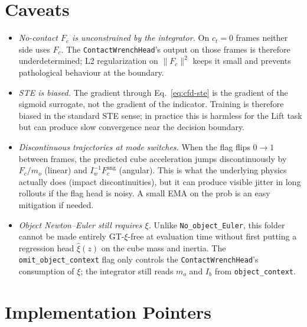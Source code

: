 \documentclass[11pt]{article}
\begin{document}
\section{Caveats}

\begin{itemize}
  \item \emph{No-contact $F_c$ is unconstrained by the integrator.}
    On $c_t = 0$ frames neither side uses $F_c$.  The
    \texttt{ContactWrenchHead}'s output on those frames is therefore
    underdetermined; L2 regularization on $\|F_c\|^2$ keeps it small
    and prevents pathological behaviour at the boundary.
  \item \emph{STE is biased.}  The gradient through
    Eq.~\eqref{eq:cfd-ste} is the gradient of the sigmoid surrogate,
    not the gradient of the indicator.  Training is therefore biased
    in the standard STE sense; in practice this is harmless for the
    Lift task but can produce slow convergence near the decision
    boundary.
  \item \emph{Discontinuous trajectories at mode switches.}  When the
    flag flips $0 \to 1$ between frames, the predicted cube
    acceleration jumps discontinuously by $F_c / m_o$ (linear) and
    $I_w^{-1} F_c^{\mathrm{ang}}$ (angular).  This is what the
    underlying physics actually does (impact discontinuities), but it
    can produce visible jitter in long rollouts if the flag head is
    noisy.  A small EMA on the prob is an easy mitigation if needed.
  \item \emph{Object Newton--Euler still requires $\xi$.}  Unlike
    \texttt{No\_object\_Euler}, this folder cannot be made entirely
    GT-$\xi$-free at evaluation time without first putting a
    regression head $\hat\xi(z)$ on the cube mass and inertia.  The
    \texttt{omit\_object\_context} flag only controls the
    \texttt{ContactWrenchHead}'s consumption of $\xi$; the integrator
    still reads $m_o$ and $I_b$ from \texttt{object\_context}.
\end{itemize}

\section{Implementation Pointers}
\end{document}
